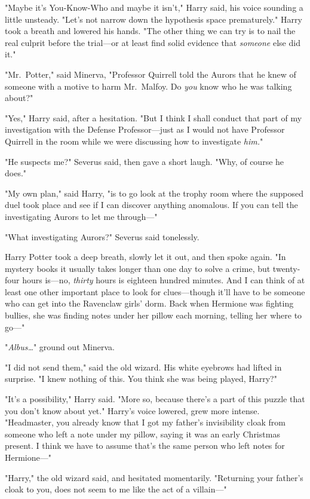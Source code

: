 "Maybe it's You-Know-Who and maybe it isn't," Harry said, his voice sounding a
little unsteady. "Let's not narrow down the hypothesis space prematurely."
Harry took a breath and lowered his hands. "The other thing we can try is to
nail the real culprit before the trial---or at least find solid evidence that
\emph{someone} else did it."

"Mr.~Potter," said Minerva, "Professor Quirrell told the Aurors that he knew of
someone with a motive to harm Mr.~Malfoy. Do \emph{you} know who he was talking
about?"

"Yes," Harry said, after a hesitation. "But I think I shall conduct that part
of my investigation with the Defense Professor---just as I would not have
Professor Quirrell in the room while we were discussing how to investigate
\emph{him.}"

"He suspects me?" Severus said, then gave a short laugh. "Why, of course he
does."

"My own plan," said Harry, "is to go look at the trophy room where the supposed
duel took place and see if I can discover anything anomalous. If you can tell
the investigating Aurors to let me through---"

"What investigating Aurors?" Severus said tonelessly.

Harry Potter took a deep breath, slowly let it out, and then spoke again. "In
mystery books it usually takes longer than one day to solve a crime, but
twenty-four hours is---no, \emph{thirty} hours is eighteen hundred minutes. And
I can think of at least one other important place to look for clues---though
it'll have to be someone who can get into the Ravenclaw girls' dorm. Back when
Hermione was fighting bullies, she was finding notes under her pillow each
morning, telling her where to go---"

"\emph{Albus{\ldots}}" ground out Minerva.

"I did not send them," said the old wizard. His white eyebrows had lifted in
surprise. "I knew nothing of this. You think she was being played, Harry?"

"It's a possibility," Harry said. "More so, because there's a part of this
puzzle that you don't know about yet." Harry's voice lowered, grew more
intense. "Headmaster, you already know that I got my father's invisibility
cloak from someone who left a note under my pillow, saying it was an early
Christmas present. I think we have to assume that's the same person who left
notes for Hermione---"

"Harry," the old wizard said, and hesitated momentarily. "Returning your
father's cloak to you, does not seem to me like the act of a villain---"

